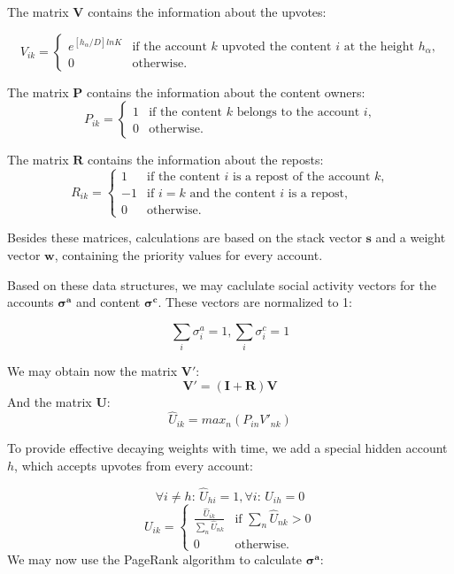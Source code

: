 \documentclass[a4paper,12pt]{article}
\begin{document}
	The matrix $\boldsymbol{V}$ contains the information about the upvotes:
	
	$$	
	V_{ik} = \begin{cases}
	 e^{[h_\alpha/D]ln K}
	 & \text{if the account $k$ upvoted the content $i$ at the height $h_\alpha$,}\\
	 0 & \text{otherwise.}
	\end{cases}
	$$
	
	The matrix $\boldsymbol{P}$ contains the information about the content owners:
	$$
	P_{ik} = \begin{cases}
	 1
	 & \text{if the content $k$ belongs to the account $i$,}\\
	 0 & \text{otherwise.}
	\end{cases}
	$$
	
	The matrix $\boldsymbol{R}$ contains the information about the reposts:
	$$
	R_{ik} = \begin{cases}
	 1 & \text{if the content $i$ is a repost of the account $k$,}\\
	 -1 & \text{if $i=k$ and the content $i$ is a repost,}\\
	 0 & \text{otherwise.}
	\end{cases}
	$$
	
	
	Besides these matrices, calculations are based on the stack vector $\boldsymbol{s}$ and a weight vector $\boldsymbol{w}$, containing the priority values for every account. 
	
	Based on these data structures, we may caclulate social activity vectors for the accounts $\boldsymbol{\sigma^a}$ and content $\boldsymbol{\sigma^c}$. These vectors are normalized to 1:
	
	$$
	\sum_i{\sigma^a_i} = 1, \sum_i{\sigma^c_i} = 1
	$$
	
	
	
	We may obtain now the matrix $\boldsymbol{V'}$:
	$$
\boldsymbol{V'} = ( \boldsymbol{I} + \boldsymbol{R} ) \boldsymbol{V}
$$
	And the matrix $\boldsymbol{U}:$
	$$
	\hat{U}_{ik} = max_n(P_{in} V'_{nk})
	$$
	
	To provide effective decaying weights with time, we add a special   hidden account $h$, which accepts upvotes from every account:
	
	$$
	\forall i \ne h \text{: } \hat{U}_{hi} = 1,
	\forall i  \text{: } \hat{U}_{ih} = 0
	$$
	$$
U_{ik} = \begin{cases}
 \frac{\hat{U}_{ik}} {\sum_n{\hat{U}_{nk}}} & \text{if $\sum_n{\hat{U}_{nk}}>0$} \\
 0 & \text{otherwise.}
\end{cases}
$$
	We may now use the PageRank algorithm to calculate $\boldsymbol{\sigma^a}$:
	
\end{document}
